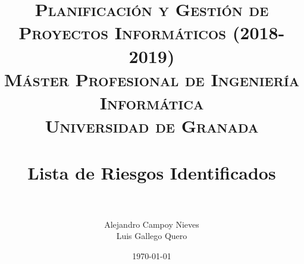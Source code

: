 

\title{	
	\normalfont \normalsize 
	\textsc{\textbf{Planificación y Gestión de Proyectos Informáticos (2018-2019)} \\ Máster Profesional de Ingeniería Informática \\ Universidad de Granada} \\ [25pt] %
	\horrule{0.5pt} \\[0.4cm] %
	\huge Lista de Riesgos Identificados \\ %
	\horrule{2pt} \\[0.5cm] %
}

\author{Alejandro Campoy Nieves \\ Luis Gallego Quero} %
\date{\normalsize\today} %

\usepackage[spanish, es-tabla]{babel}
\usepackage{hyperref} %
\hypersetup{
	colorlinks=true,
	linkcolor=blue,
	filecolor=magenta,      
	urlcolor=cyan,
}
\usepackage{graphicx}
\usepackage{amssymb, amsmath, amsbsy}
\usepackage{mathptmx}	
\usepackage{float}
\usepackage{booktabs}					%
\usepackage{eurosym}
\usepackage{xcolor}
\usepackage{colortbl}




	\maketitle %
	
	\newpage %
	
	\tableofcontents %
	
	
	
	\newpage	
 
